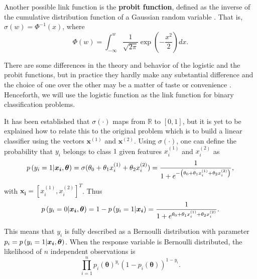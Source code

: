 
Another possible link function is the \textbf{probit function}, defined as the inverse of the cumulative distribution function of a Gaussian random variable \cite[p.~296]{friedman2001elements}. That is, $\sigma(w) = \Phi^{-1}\left( x \right)$,
where
\begin{equation}
  \Phi(w) = \int_{-\infty}^w \frac{1}{\sqrt{2 \pi}} \exp{\left( -\frac{x^2}{2} \right)} dx.
\end{equation}

There are some differences in the theory and behavior of the logistic and the probit functions, but in practice they hardly make any substantial difference and the choice of one over the other may be a matter of taste or convenience \cite[p.~118]{gelman2006data}. Henceforth, we will use the logistic function as the link function for binary classification problems.

It has been established that $\sigma \left( \cdot \right)$ maps from $\mathbb{R}$ to $\left[ 0,1 \right]$, but it is yet to be explained how to relate this to the original problem which is to build a linear classifier using the vectors $\boldsymbol{x}^{(1)}$ and $\boldsymbol{x}^{(2)}$. Using  $\sigma \left( \cdot \right)$, one can define the probability that $y_i$ belongs to class $1$ given features $x_i^{(1)}$ and $x_i^{(2)}$ as
\begin{equation}
  p\left( y_i = 1 | \boldsymbol{x_i}, \boldsymbol{\theta} \right) = \sigma(\theta_0 + \theta_1 x_i^{(1)} + \theta_2 x_i^{(2)}) = \frac{1}{1 + e^{-\left( \theta_0 + \theta_1 x_i^{(1)} + \theta_2 x_i^{(2)} \right)}},
\end{equation}
with $\boldsymbol{x_i} = \left[ x_i^{(1)}, x_i^{(2)} \right]^T$. Thus
\begin{equation}
  p\left( y_i = 0 | \boldsymbol{x_i}, \boldsymbol{\theta} \right) = 1 - p\left( y_i = 1 | \boldsymbol{x_i} \right) = \frac{1}{1 + e^{\theta_0 + \theta_1 x_i^{(1)} + \theta_2 x_i^{(2)}}}.
\end{equation}

This means that $y_i$ is fully described as a Bernoulli distribution with parameter $p_i =p\left( y_i = 1 | \boldsymbol{x_i}, \boldsymbol{\theta} \right)$. When the response variable is Bernoulli distributed, the likelihood of $n$ independent observations is
\begin{equation}
  \prod_{i = 1}^n  p_i(\boldsymbol{\theta})^{y_i}\left(1 - p_i(\boldsymbol{\theta}) \right)^{1 - y_i}.
\end{equation}

